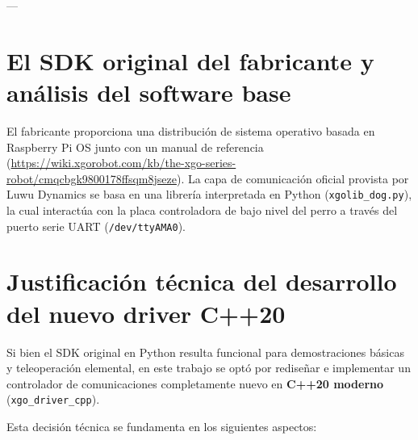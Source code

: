 ---

\section{El SDK original del fabricante y análisis del software base}
\label{sec:sdk}

El fabricante proporciona una distribución de sistema operativo basada en Raspberry Pi OS junto con un manual de referencia (\url{https://wiki.xgorobot.com/kb/the-xgo-series-robot/cmqcbgk9800178ffsqm8jseze}). La capa de comunicación oficial provista por Luwu Dynamics se basa en una librería interpretada en Python (\texttt{xgolib\_dog.py}), la cual interactúa con la placa controladora de bajo nivel del perro a través del puerto serie UART (\texttt{/dev/ttyAMA0}).

\section{Justificación técnica del desarrollo del nuevo driver C++20}
\label{sec:justificacion_cpp}

Si bien el SDK original en Python resulta funcional para demostraciones básicas y teleoperación elemental, en este trabajo se optó por rediseñar e implementar un controlador de comunicaciones completamente nuevo en \textbf{C++20 moderno} (\texttt{xgo\_driver\_cpp}). 

Esta decisión técnica se fundamenta en los siguientes aspectos:


